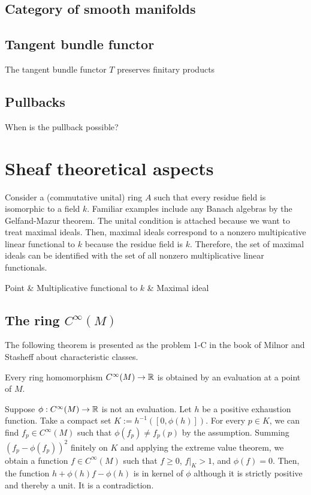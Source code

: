 \documentclass{../note}
\begin{document}
\section{Category of smooth manifolds}


\section{Tangent bundle functor}

\begin{thm}
The tangent bundle functor $T$ preserves finitary products
\end{thm}


\section{Pullbacks}
When is the pullback possible?








\chapter{Sheaf theoretical aspects}
Consider a (commutative unital) ring $A$ such that every residue field is isomorphic to a field $k$.
Familiar examples include any Banach algebras by the Gelfand-Mazur theorem.
The unital condition is attached because we want to treat maximal ideals.
Then, maximal ideals correspond to a nonzero multipicative linear functional to $k$ because the residue field is $k$.
Therefore, the set of maximal ideals can be identified with the set of all nonzero multiplicative linear functionals.


\begin{rd}
Point  & Multiplicative functional to $k$  & Maximal ideal 
\end{rd}

\section{The ring $C^\infty(M)$}
The following theorem is presented as the problem 1-C in the book of Milnor and Stasheff about characteristic classes.
\begin{thm}
Every ring homomorphism $C^\infty(M)\to\mathbb{R}$ is obtained by an evaluation at a point of $M$.
\end{thm}
\begin{pf}
Suppose $\phi:C^\infty(M)\to\mathbb{R}$ is not an evaluation.
Let $h$ be a positive exhaustion function.
Take a compact set $K:=h^{-1}([0,\phi(h)])$.
For every $p\in K$, we can find $f_p\in C^\infty(M)$ such that $\phi(f_p)\ne f_p(p)$ by the assumption.
Summing $(f_p-\phi(f_p))^2$ finitely on $K$ and applying the extreme value theorem, we obtain a function $f\in C^\infty(M)$ such that $f\ge0$, $f|_K>1$, and $\phi(f)=0$.
Then, the function $h+\phi(h)f-\phi(h)$ is in kernel of $\phi$ although it is strictly positive and thereby a unit.
It is a contradiction.
\end{pf}
\end{document}

